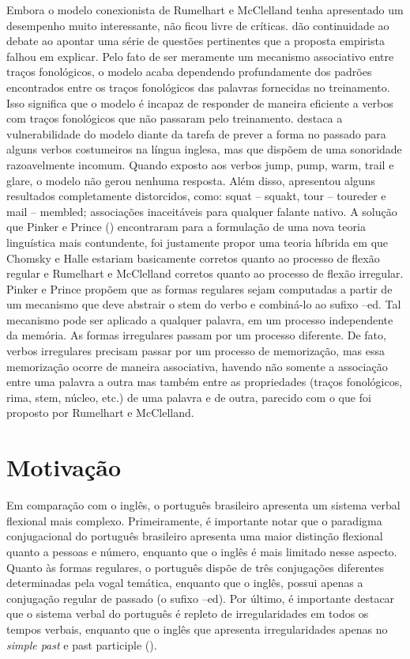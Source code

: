 Embora o modelo conexionista de Rumelhart e McClelland tenha apresentado um desempenho muito interessante, não ficou livre de críticas. \cite{Pinker:1988} dão continuidade ao debate ao apontar uma série de questões pertinentes que a proposta empirista falhou em explicar.  Pelo fato de ser meramente um mecanismo associativo entre traços fonológicos, o modelo acaba dependendo profundamente dos padrões encontrados entre os traços fonológicos das palavras fornecidas no treinamento. Isso significa que o modelo é incapaz de responder de maneira eficiente a verbos com traços fonológicos que não passaram pelo treinamento. \cite{Pinker:1999} destaca a vulnerabilidade do modelo diante da tarefa de prever a forma no passado para alguns verbos costumeiros na língua inglesa, mas que dispõem de uma sonoridade razoavelmente incomum. Quando exposto aos verbos jump, pump, warm,  trail e glare, o modelo não gerou nenhuma resposta. Além disso, apresentou alguns resultados completamente distorcidos, como: squat – squakt, tour – toureder e mail – membled; associações inaceitáveis para qualquer falante nativo. A solução que Pinker e Prince (\citeyear{Pinker:1988}) encontraram para a formulação de uma nova teoria linguística mais contundente, foi justamente propor uma teoria híbrida em que Chomsky e Halle estariam basicamente corretos quanto ao processo de flexão regular e Rumelhart e McClelland corretos quanto ao processo de flexão irregular. Pinker e Prince propõem que as formas regulares sejam computadas a partir de um mecanismo que deve abstrair o stem do verbo e combiná-lo ao sufixo –ed.  Tal mecanismo pode ser aplicado a qualquer palavra, em um processo independente da memória. As formas irregulares passam por um processo diferente. De fato, verbos irregulares precisam passar por um processo de memorização, mas essa memorização ocorre de maneira associativa, havendo não somente a associação entre uma palavra a outra mas também entre as propriedades (traços fonológicos, rima, stem, núcleo, etc.) de uma palavra e de outra, parecido com o que foi proposto por Rumelhart e McClelland.
\section{Motivação}
\label{sec:motivation}

Em comparação com o inglês, o português brasileiro apresenta um sistema verbal flexional mais complexo. Primeiramente, é importante notar que o paradigma conjugacional do português brasileiro apresenta uma maior distinção flexional quanto a pessoas e número, enquanto que o inglês é mais limitado nesse aspecto. Quanto às formas regulares, o português dispõe de três conjugações diferentes determinadas pela vogal temática, enquanto que o inglês, possui apenas a conjugação regular de passado (o sufixo –ed). Por último, é importante destacar que o sistema verbal do português é repleto de irregularidades em todos os tempos verbais, enquanto que o inglês que apresenta irregularidades apenas no \textit{simple past} e past participle (\cite{wuerges:2014}).

